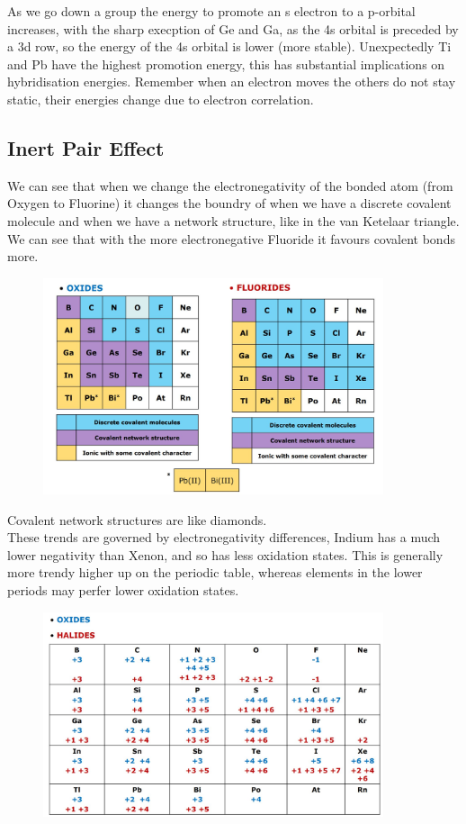 \documentclass{article}
\newcommand{\NB}{{\large\lefthand}\quad}
\begin{document}
    As we go down a group the energy to promote an s electron to a p-orbital increases, with the sharp execption of 
    Ge and Ga, as the 4s orbital is preceded by a 3d row, so the energy of the 4s orbital is lower (more stable). 
    Unexpectedly Ti and Pb have the highest promotion energy, this has substantial implications on hybridisation
    energies. Remember when an electron moves the others do not stay static, their energies change due to
    electron correlation.
    \newpage
    \subsection{Inert Pair Effect}

    We can see that when we change the electronegativity of the bonded atom (from Oxygen to Fluorine) it changes
    the boundry of when we have a discrete covalent molecule and when we have a network structure, like in the
    van Ketelaar triangle. We can see that with the more electronegative Fluoride it favours covalent bonds more.

    \begin{figure}[h]
        \centering
        \includegraphics[width=10cm]{of.jpg}
    \end{figure}
    \NB Covalent network structures are like diamonds.\\

    These trends are governed by electronegativity differences, Indium has a much lower negativity than Xenon,
    and so has less oxidation states. This is generally more trendy higher up on the periodic table, whereas 
    elements in the lower periods may perfer lower oxidation states. 

    \begin{figure}[h]
        \centering
        \includegraphics[width=10cm]{ox.jpg}
    \end{figure}
\end{document}

